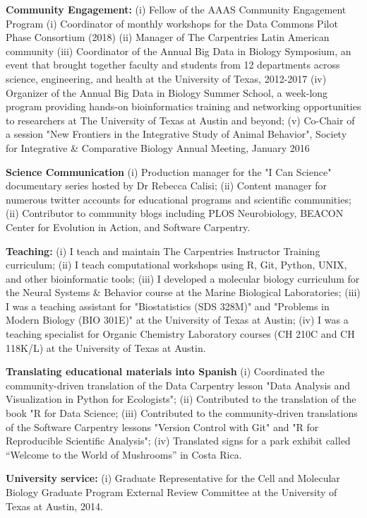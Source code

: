 \documentclass[svgnames,11pt]{article}
\begin{document}
\begin{bibenum}[itemsep=4pt]

    \item \textbf{Community Engagement:}
        (i) Fellow of the AAAS Community Engagement Program
        (i) Coordinator of monthly workshops for the Data Commons Pilot Phase Consortium (2018) 
        (ii) Manager of The Carpentries Latin American community
        (iii) Coordinator of the Annual Big Data in Biology Symposium, an event that brought together faculty and students from 12 departments across science, engineering, and health at the University of Texas, 2012-2017
        (iv) Organizer of the Annual Big Data in Biology Summer School, a week-long program providing hands-on bioinformatics training and networking opportunities to researchers at The University of Texas at Austin and beyond;
        (v) Co-Chair of a session "New Frontiers in the Integrative Study of Animal Behavior", Society for Integrative \& Comparative Biology Annual Meeting, January 2016 

    \item \textbf{Science Communication}
        (i) Production manager for the "I Can Science" documentary series hosted by Dr Rebecca Calisi;
        (ii) Content manager for numerous twitter accounts for educational programs and scientific communities;
        (ii) Contributor to community blogs including PLOS Neurobiology, BEACON Center for Evolution in Action, and Software Carpentry.
   
     \item \textbf{Teaching:}
        (i) I teach and maintain The Carpentries Instructor Training curriculum; 
        (ii) I teach computational workshops using R, Git, Python, UNIX, and other bioinformatic tools;
        (iii) I developed a molecular biology curriculum for the Neural Systems \& Behavior course at the Marine Biological Laboratories;
        (iii) I was a teaching assistant for "Biostatistics (SDS 328M)" and "Problems in Modern Biology (BIO 301E)" at the University of Texas at Austin;
        (iv) I was a teaching specialist for Organic Chemistry Laboratory courses (CH 210C and CH 118K/L) at the University of Texas at Austin.

        
    \item \textbf{Translating educational materials into Spanish}
        (i) Coordinated the community-driven translation of the Data Carpentry lesson "Data Analysis and Visualization in Python for Ecologists";
        (ii) Contributed to the translation of the book "R for Data Science;
        (iii) Contributed to the community-driven translations of the Software Carpentry lessons "Version Control with Git" and "R for Reproducible Scientific Analysis";
        (iv) Translated signs for a park exhibit called “Welcome to the World of Mushrooms” in Costa Rica.

   \item \textbf{University service:} 
        (i) Graduate Representative for the Cell and Molecular Biology Graduate Program External Review Committee at the University of Texas at Austin, 2014.
        

\end{bibenum}
\end{document}
